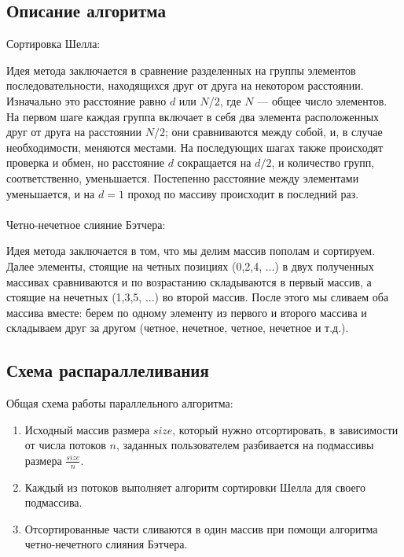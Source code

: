 \documentclass{report}
\begin{document}
\begin{center}
\section*{Описание алгоритма}
\end{center}
Сортировка Шелла:
\par Идея метода заключается в сравнение разделенных на группы элементов последовательности, находящихся друг от друга на некотором расстоянии. Изначально это расстояние равно $d$ или $N/2$, где $N$ — общее число элементов. На первом шаге каждая группа включает в себя два элемента расположенных друг от друга на расстоянии $N/2$; они сравниваются между собой, и, в случае необходимости, меняются местами. На последующих шагах также происходят проверка и обмен, но расстояние $d$ сокращается на $d/2$, и количество групп, соответственно, уменьшается. Постепенно расстояние между элементами уменьшается, и на $d=1$ проход по массиву происходит в последний раз.\\
\\
Четно-нечетное слияние Бэтчера:
\par Идея метода заключается в том, что мы делим массив пополам и сортируем. Далее элементы, стоящие на четных позициях (0,2,4, ...) в двух полученных массивах сравниваются  и по возрастанию складываются в первый массив, а стоящие на нечетных (1,3,5, ...) во второй массив. После этого мы сливаем оба массива вместе: берем по одному элементу из первого и второго массива и складываем друг за другом (четное, нечетное, четное, нечетное и т.д.).
\newpage

\begin{center}
\section*{Схема распараллеливания}
\end{center}
Общая схема работы параллельного алгоритма:
\begin{enumerate}
\item Исходный массив размера $size$, который нужно отсортировать, в зависимости от числа потоков $n$, заданных пользователем разбивается на  подмассивы размера $\frac{size}{n}$.
\item Каждый из потоков выполняет алгоритм сортировки Шелла для своего подмассива.
\item Отсортированные части сливаются в один массив при помощи алгоритма четно-нечетного слияния Бэтчера.
\end{enumerate}
\newpage
\end{document}
